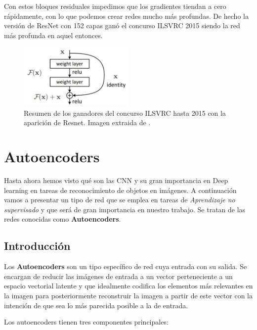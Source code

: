         \noindent Con estos bloques residuales impedimos que los gradientes tiendan a cero rápidamente, con lo que podemos crear redes mucho más profundas. De hecho la versión de ResNet con 152 capas ganó el concurso ILSVRC 2015 siendo la red más profunda en aquel entonces. 

        \begin{figure}[!h]
            \centering
            \includegraphics[width=0.5\textwidth]{img/resnet_module.jpeg}
            \caption{Resumen de los ganadores del concurso ILSVRC hasta 2015 con la aparición de Resnet. Imagen extraida de \cite{StanfordCourse}.}
            \label{fig:ImageNet}
        \end{figure}


\section{Autoencoders}
    \noindent Hasta ahora hemos visto qué son las CNN y su gran importancia en Deep learning en tareas de reconocimiento de objetos en imágenes. A continuación vamos a presentar un tipo de red que se emplea en tareas de \textit{Aprendizaje no supervisado} y que será de gran importancia en nuestro trabajo. Se tratan de las redes conocidas como \textbf{Autoencoders}.

    \subsection{Introducción}
        \noindent Los \textbf{Autoencoders} \cite{GAN2} son un tipo específico de red cuya entrada  con su salida. Se encargan de reducir las imágenes de entrada a un vector perteneciente a un espacio vectorial latente y que idealmente codifica los elementos más relevantes en la imagen para posteriormente reconstruir la imagen a partir de este vector con la intención de que sea lo más parecida posible a la de entrada.

        \medskip

        \noindent Los autoencoders tienen tres componentes principales: 

